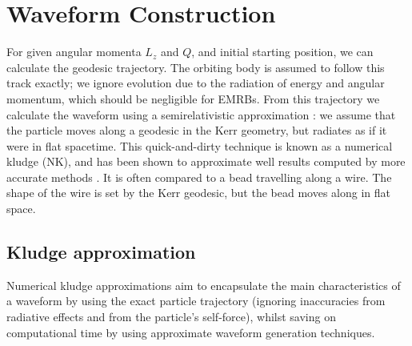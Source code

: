 \documentclass[useAMS,usedcolumn,usegraphicx,usenatbib]{mn2e}
\begin{document}
\section{Waveform Construction}\label{sec:Kludge}

For given angular momenta $L_z$ and $Q$, and initial starting position, we can calculate the geodesic trajectory. The orbiting body is assumed to follow this track exactly; we ignore evolution due to the radiation of energy and angular momentum, which should be negligible for EMRBs. From this trajectory we calculate the waveform using a semirelativistic approximation \citep{Ruffini1981}: we assume that the particle moves along a geodesic in the Kerr geometry, but radiates as if it were in flat spacetime. This quick-and-dirty technique is known as a numerical kludge (NK), and has been shown to approximate well results computed by more accurate methods \citep{Babak2007}. It is often compared to a bead travelling along a wire. The shape of the wire is set by the Kerr geodesic, but the bead moves along in flat space.

\subsection{Kludge approximation}

Numerical kludge approximations aim to encapsulate the main characteristics of a waveform by using the exact particle trajectory (ignoring inaccuracies from radiative effects and from the particle's self-force), whilst saving on computational time by using approximate waveform generation techniques.
\end{document}
